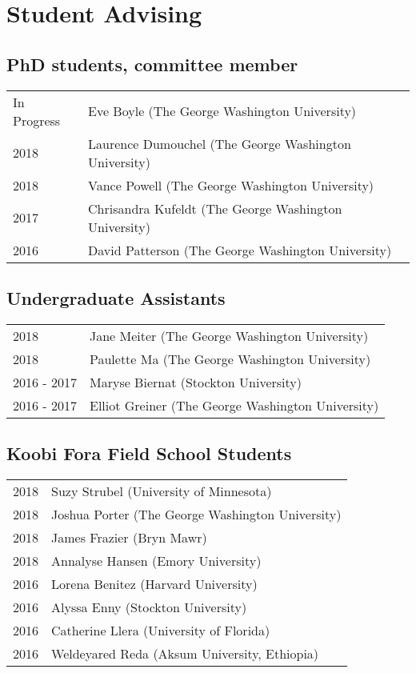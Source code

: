 \documentclass{article}
\begin{document}
\section*{Student Advising}
\subsection*{PhD students, committee member}
\begin{tabular}{p{}p{}}
In Progress & Eve Boyle (The George Washington University)\\[4pt]
2018 & Laurence Dumouchel (The George Washington University)\\[4pt]
2018 & Vance Powell (The George Washington University)\\[4pt]
2017 & Chrisandra Kufeldt (The George Washington University)\\[4pt]
2016 & David Patterson (The George Washington University)\\

\end{tabular}

\subsection*{Undergraduate Assistants}
\begin{tabular}{p{}p{}}
2018 & Jane Meiter (The George Washington University)\\[4pt]
2018 & Paulette Ma (The George Washington University)\\[4pt]
2016 - 2017 & Maryse Biernat (Stockton University)\\[4pt]
2016 - 2017 & Elliot Greiner (The George Washington University)\\
\end{tabular}

\subsection*{Koobi Fora Field School Students}
\begin{tabular}{p{}p{}}
2018 & Suzy Strubel (University of Minnesota)\\[4pt]
2018 & Joshua Porter (The George Washington University)\\[4pt]
2018 & James Frazier (Bryn Mawr)\\[4pt] 
2018 & Annalyse Hansen (Emory University)\\[4pt]
2016 & Lorena Benitez (Harvard University)\\[4pt]
2016 & Alyssa Enny (Stockton University)\\[4pt]
2016 & Catherine Llera (University of Florida)\\[4pt]
2016 & Weldeyared Reda (Aksum University, Ethiopia)\\
\end{tabular}
\end{document}
